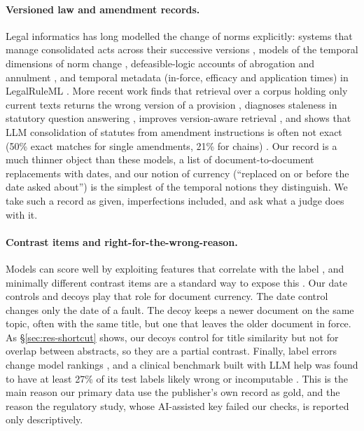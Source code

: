 \paragraph{Versioned law and amendment records.}
Legal informatics has long modelled the change of norms explicitly: systems that manage consolidated acts across their
successive versions \citep{palmirani2002norma}, models of the temporal dimensions of norm change
\citep{palmirani2006time}, defeasible-logic accounts of abrogation and
annulment \citep{governatori2010changing}, and temporal metadata (in-force, efficacy and
application times) in LegalRuleML \citep{palmirani2011legalruleml}.
More recent work finds that retrieval over a corpus holding only current texts returns the wrong version of a
provision \citep{cymbler2026temporal},
diagnoses staleness in statutory question answering \citep{prior2026oldfriend}, improves version-aware retrieval
\citep{huwiler2025versionrag,nam2026timelyrag}, and shows that LLM consolidation of statutes from amendment
instructions is often not exact (50\% exact matches for single amendments, 21\% for chains)
\citep{prior2025consolidation}. Our record is a much thinner object than these models, a list of
document-to-document replacements with dates, and our notion of currency (``replaced on or before the date asked
about'') is the simplest of the temporal notions they distinguish. We take such a record as given, imperfections
included, and ask what a judge does with it.

\paragraph{Contrast items and right-for-the-wrong-reason.}
Models can score well by exploiting features that correlate with the label \citep{mccoy2019right}, and minimally
different contrast items are a standard way to expose this \citep{gardner2020contrast}. Our date controls and decoys
play that role for document currency. The date control changes only the date of a fault. The decoy keeps a newer
document on the same topic, often with the same title, but one that leaves the older document in force. As
\S\ref{sec:res-shortcut} shows, our decoys control for title similarity but not for overlap between abstracts, so they
are a partial contrast. Finally, label errors change model rankings \citep{northcutt2021pervasive,gema2025mmlu}, and
a clinical benchmark built with LLM help was found to have at least 27\% of its test labels likely wrong or
incomputable \citep{ye2025stewardship}. This is the main reason our
primary data use the publisher's own record as gold, and the reason the regulatory study, whose AI-assisted key failed
our checks, is reported only descriptively.
